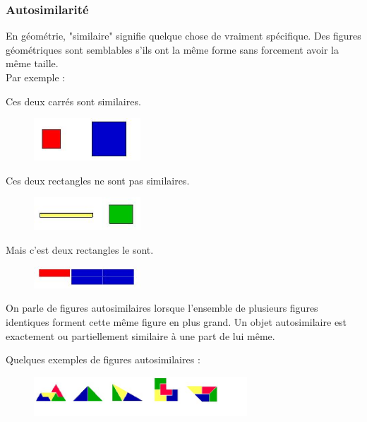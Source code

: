 \documentclass[a4paper]{article}
\begin{document}
\subsubsection{Autosimilarité}
En géométrie, "similaire" signifie quelque chose de vraiment spécifique. Des figures géométriques sont semblables s'ils ont la même forme sans forcement avoir la même taille.\\

Par exemple :
\begin{center}
Ces deux carrés sont similaires.
\begin{figure}[H]\begin{center}
\includegraphics[width=4cm]{squares.jpg}
\end{center}
\end{figure}

Ces deux rectangles ne sont pas similaires.
\begin{figure}[H]\begin{center}
\includegraphics[width=4cm]{rec.jpg}
\end{center}
\end{figure}

Mais c'est deux rectangles le sont.
\begin{figure}[H]\begin{center}
\includegraphics[width=4cm]{srec.jpg}
\end{center}
\end{figure}
\end{center}

On parle de figures autosimilaires lorsque l'ensemble de plusieurs figures identiques forment cette même figure en plus grand.
Un objet autosimilaire est exactement ou partiellement similaire à une part de lui même.

Quelques exemples de figures autosimilaires :

\begin{figure}[H]
\begin{center}
\includegraphics[width=8cm]{figures.jpg}
\end{center}
\end{figure}
\end{document}
